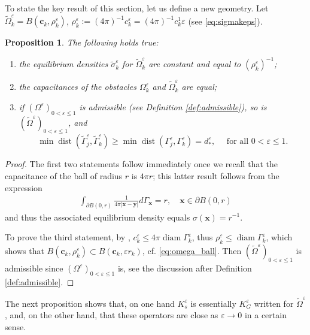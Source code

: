 \documentclass[]{article}
\newtheorem{proposition}{Proposition}
\numberwithin{equation}{section}
\numberwithin{theorem}{section}
\numberwithin{lemma}{section}
\numberwithin{corollary}{section}
\numberwithin{proposition}{section}
\numberwithin{definition}{section}
\newcommand{\bx}{\boldsymbol{x}}
\newcommand{\by}{\boldsymbol{y}}
\newcommand{\re}{\varepsilon}
\renewcommand{\vec}{\boldsymbol}
\begin{document}
	To state the key result of this section, let us define a new geometry. Let  $\widetilde{\Omega}^{\varepsilon}_k=B(\vec{c}_k, \rho^{\re}_k)$, $\rho^{\re}_k:=(4\pi)^{-1}c_k^{\varepsilon}=(4\pi)^{-1}c_k^1\re$ (see \eqref{eq:sigmakeps}). 
	\begin{proposition}
		\label{prop:difM1_geometry}
		The following holds true:  
		\begin{enumerate}
			\item the equilibrium densities $\widetilde{\sigma}^{\re}_k$ for $\widetilde{\Omega}_k^{\re}$ are constant and equal to $(\rho_k^{\re})^{-1}$;
			\item the capacitances of the obstacles $\Omega^{\varepsilon}_k$ and $\widetilde{\Omega}^{\varepsilon}_k$ are equal;
			\item if $(\Omega^{\re})_{0<\re\leq1}$ is admissible (see Definition \ref{def:admissible}), so is $(\widetilde{\Omega}^{\re})_{0<\re\leq1}$, and $$\operatorname{min}\operatorname{dist}(\widetilde{\Gamma}_j^{\re}, \widetilde{\Gamma}_k^{\re})\geq 
			\operatorname{min}\operatorname{dist}({\Gamma}_j^{\re}, {\Gamma}_k^{\re})=d^{\re}_*, \quad \text{ for all }0<\re\leq 1.$$
		\end{enumerate}
		
	\end{proposition}
	\begin{proof}
		The first two statements follow immediately once we recall that the capacitance of the ball of radius $r$ is $4\pi r$; this latter result follows from the expression 
		\begin{align*}%
			\int_{\partial B(0,r)}\frac{1}{4\pi | \bx-\by |}d\Gamma_{\bx}=r, \quad \vec{x}\in \partial B(0,r)
		\end{align*}
		and thus the associated equilibrium density equals $\sigma(\vec{x})=r^{-1}$. 
		
		To prove the third statement, by \cite[Exercise 8.12, p. 272]{mclean}, $c_k^{\re}\leq 4\pi \operatorname{diam}\Gamma_k^{\re}$, thus $\rho_k^{\re}\leq \operatorname{diam}\Gamma_k^{\re}$, which shows that $B(\vec{c}_k, \rho_k^{\re})\subset B(\vec{c}_k, \re r_k)$, cf. \eqref{eq:omega_ball}. Then $(\widetilde{\Omega}^{\re})_{0<\re\leq 1}$ is admissible since $(\Omega^{\re})_{0<\re\leq 1}$ is, see the discussion after Definition \ref{def:admissible}. 
	\end{proof}
	The next proposition shows that, on one hand $K^{\re}_{s}$ is essentially $K^{\re}_G$ written for $\widetilde{\Omega}^{\re}$, and, on the other hand, that these operators are close as $\re\rightarrow 0$ in a certain sense. 
\end{document}
